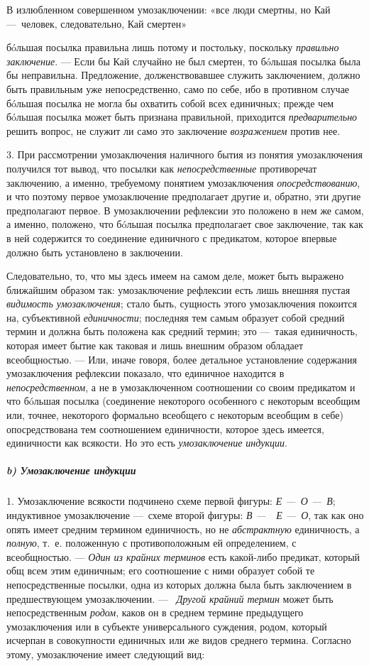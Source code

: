 \documentclass[twoside]{article}
\begin{document}
{{{{{В излюбленном совершенном умозаключении:
«все люди смертны,
но Кай —~человек,
следовательно, Кай смертен»

бóльшая посылка правильна лишь потому и постольку, поскольку
{\em правильно заключение}. —
Если бы Кай случайно не был смертен, то бóльшая посылка была
бы неправильна. Предложение, долженствовавшее служить заключением, должно
быть правильным уже непосредственно, само по себе, ибо в противном случае
бóльшая посылка не могла бы охватить собой всех единичных; прежде чем
бóльшая посылка может быть признана правильной, приходится
{\em предварительно}
решить вопрос, не служит ли само это заключение
{\em возражением} против
нее.

3. При рассмотрении умозаключения наличного бытия из понятия
умозаключения получился тот вывод, что посылки как
{\em непосредственные}
противоречат заключению, а именно, требуемому понятием
умозаключения {\em опосредствованию},
и что поэтому первое умозаключение предполагает другие и,
обратно, эти другие предполагают первое. В умозаключении рефлексии это
положено в нем же самом, а именно, положено, что бóльшая
посылка предполагает свое заключение, так как в ней содержится то
соединение единичного с предикатом, которое впервые должно быть установлено
в заключении.

Следовательно, то, что мы здесь имеем на самом деле, может
быть выражено ближайшим образом так: умозаключение рефлексии есть лишь
внешняя пустая {\em видимость
умозаключения}; стало быть, сущность этого умозаключения
покоится на, субъективной
{\em единичности};
последняя тем самым образует собой средний термин и должна
быть положена как средний термин; это  —~такая единичность,
которая имеет бытие как таковая и лишь внешним образом обладает
всеобщностью. — Или, иначе говоря, более детальное
установление содержания умозаключения рефлексии показало, что единичное
находится в {\em непосредственном},
а не в умозаключенном соотношении со своим предикатом и что
бóльшая посылка (соединение некоторого особенного с некоторым всеобщим или,
точнее, некоторого формально всеобщего с некоторым всеобщим в себе)
опосредствована тем соотношением единичности, которое здесь имеется,
единичности как всякости. Но это есть
{\em умозаключение индукции}.

\subparagraph[b) Умозаключение индукции]{b) Умозаключение индукции }
1. Умозаключение всякости подчинено схеме первой фигуры:
{\em Е —~О
—~В}; индуктивное умозаключение
—~схеме второй фигуры:
{\em В —~~Е
—~О}, так как оно опять имеет средним термином
единичность, но не {\em абстрактную}
единичность, а
{\em полную}, т.~е.
положенную с противоположным ей определением, с всеобщностью. —
{\em Один из крайних терминов}
есть какой-либо предикат, который общ всем этим единичным;
его соотношение с ними образует собой те непосредственные посылки, одна из
которых должна была быть заключением в предшествующем умозаключении. —
\ {\em Другой крайний термин}
может быть непосредственным
{\em родом}, каков он в
среднем термине предыдущего умозаключения или в субъекте универсального
суждения, родом, который исчерпан в совокупности единичных или же видов
среднего термина. Согласно этому, умозаключение имеет следующий вид:

}}}}}
\end{document}
